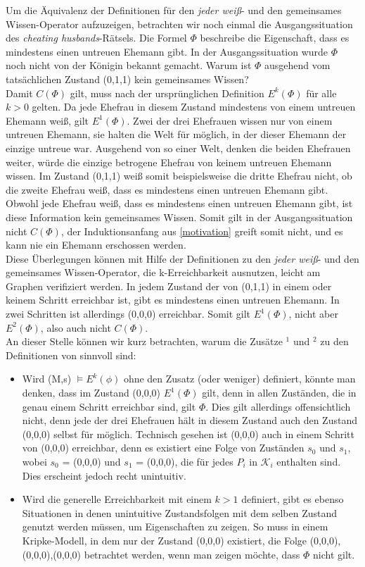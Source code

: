 Um die Äquivalenz der Definitionen für den \textit{jeder weiß}- und den gemeinsames Wissen-Operator aufzuzeigen, betrachten wir noch einmal die Ausgangssituation des \textit{cheating husbands}-Rätsels. 
Die Formel $\Phi$ beschreibe die Eigenschaft, dass es mindestens einen untreuen Ehemann gibt.
In der Ausgangssituation wurde $\Phi$ noch nicht von der Königin bekannt gemacht.
Warum ist $\Phi$ ausgehend vom tatsächlichen Zustand (0,1,1) kein gemeinsames Wissen?\\
Damit $C(\Phi)$ gilt, muss nach der ursprünglichen Definition $E^k(\Phi)$ für alle $k>0$ gelten.
Da jede Ehefrau in diesem Zustand mindestens von einem untreuen Ehemann weiß, gilt $E^1(\Phi)$.
Zwei der drei Ehefrauen wissen nur von einem untreuen Ehemann, sie halten die Welt für möglich, in der dieser Ehemann der einzige untreue war.
Ausgehend von so einer Welt, denken die beiden Ehefrauen weiter, würde die einzige betrogene Ehefrau von keinem untreuen Ehemann wissen.
Im Zustand (0,1,1) weiß somit beispielsweise die dritte Ehefrau nicht, ob die zweite Ehefrau weiß, dass es mindestens einen untreuen Ehemann gibt.
Obwohl jede Ehefrau weiß, dass es mindestens einen untreuen Ehemann gibt, ist diese Information kein gemeinsames Wissen.
Somit gilt in der Ausgangssituation nicht $C(\Phi)$, der Induktionsanfang aus \ref{motivation} greift somit nicht, und es kann nie ein Ehemann erschossen werden.\\
Diese Überlegungen können mit Hilfe der Definitionen zu den \textit{jeder weiß}- und den gemeinsames Wissen-Operator, die k-Erreichbarkeit ausnutzen, leicht am Graphen verifiziert werden.
In jedem Zustand der von (0,1,1) in einem oder keinem Schritt erreichbar ist, gibt es mindestens einen untreuen Ehemann. In zwei Schritten ist allerdings (0,0,0) erreichbar. Somit gilt $E^1(\Phi)$, nicht aber $E^2(\Phi)$, also auch nicht $C(\Phi)$.\\

An dieser Stelle können wir kurz betrachten, warum die Zusätze $^1$ und $^2$ zu den Definitionen von \cite{kshemkalyani2011distributed} sinnvoll sind:
\begin{itemize}
	\item Wird (M,s) $\vDash E^{k}(\phi)$ ohne den Zusatz (oder weniger) definiert, könnte man denken, dass im Zustand (0,0,0) $E^1(\Phi)$ gilt, denn in allen Zuständen, die in genau einem Schritt erreichbar sind, gilt $\Phi$. Dies gilt allerdings offensichtlich nicht, denn jede der drei Ehefrauen hält in diesem Zustand auch den Zustand (0,0,0) selbst für möglich. Technisch gesehen ist (0,0,0) auch in einem Schritt von (0,0,0) erreichbar, denn es existiert eine Folge von Zuständen $s_0$ und $s_1$, wobei $s_0$ = (0,0,0) und $s_1$ = (0,0,0), die für jedes $P_i$ in $\mathcal{K}_i$ enthalten sind. Dies erscheint jedoch recht unintuitiv.
	\item Wird die generelle Erreichbarkeit mit einem $k > 1$ definiert, gibt es ebenso Situationen in denen unintuitive Zustandsfolgen mit dem selben Zustand genutzt werden müssen, um Eigenschaften zu zeigen. So muss in einem Kripke-Modell, in dem nur der Zustand (0,0,0) existiert, die Folge (0,0,0),(0,0,0),(0,0,0) betrachtet werden, wenn man zeigen möchte, dass $\Phi$ nicht gilt.
\end{itemize}
 
 